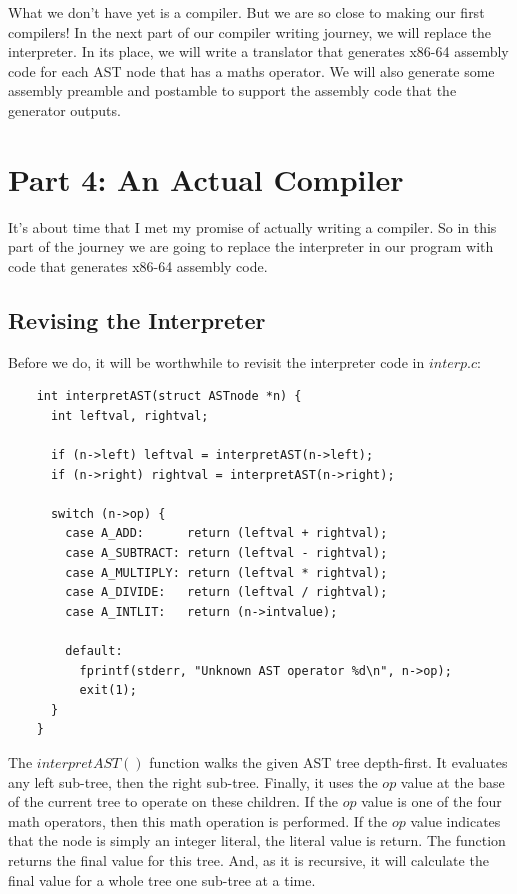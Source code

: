 \documentclass[journal, onecolumn, 12pt]{IEEEtran}
\begin{document}
What we don't have yet is a compiler. But we are so close to making our first compilers! In the next part of our compiler writing journey, we will replace the interpreter. In its place, we will write a translator that generates x86-64 assembly code for each AST node that has a maths operator. We will also generate some assembly preamble and postamble to support the assembly code that the generator outputs.

\section{Part 4: An Actual Compiler}

It's about time that I met my promise of actually writing a compiler. So in this part of the journey we are going to replace the interpreter in our program with code that generates x86-64 assembly code.

\subsection{Revising the Interpreter}

Before we do, it will be worthwhile to revisit the interpreter code in $interp.c$:

\begin{lstlisting}
    int interpretAST(struct ASTnode *n) {
      int leftval, rightval;
    
      if (n->left) leftval = interpretAST(n->left);
      if (n->right) rightval = interpretAST(n->right);
    
      switch (n->op) {
        case A_ADD:      return (leftval + rightval);
        case A_SUBTRACT: return (leftval - rightval);
        case A_MULTIPLY: return (leftval * rightval);
        case A_DIVIDE:   return (leftval / rightval);
        case A_INTLIT:   return (n->intvalue);
    
        default:
          fprintf(stderr, "Unknown AST operator %d\n", n->op);
          exit(1);
      }
    }
\end{lstlisting}

The $interpretAST()$ function walks the given AST tree depth-first. It evaluates any left sub-tree, then the right sub-tree. Finally, it uses the $op$ value at the base of the current tree to operate on these children. If the $op$ value is one of the four math operators, then this math operation is performed. If the $op$ value indicates that the node is simply an integer literal, the literal value is return. The function returns the final value for this tree. And, as it is recursive, it will calculate the final value for a whole tree one sub-tree at a time.
\end{document}
